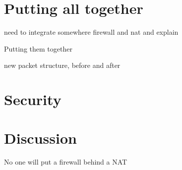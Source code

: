 \section{Putting all together}\label{sec:all}

need to integrate somewhere firewall and nat and explain

Putting them together

new packet structure, before and after


\section{Security}

\section{Discussion}

No one will put a firewall behind a NAT